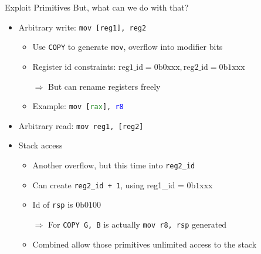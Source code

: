 \documentclass[usenames,dvipsnames]{beamer}
\begin{document}
    \begin{frame}{Exploit Primitives}
        But, what can we do with that?
        \begin{itemize}
            \item Arbitrary write: \lstinline{mov [reg1], reg2}
             {
            \begin{itemize}
                \item Use \lstinline{COPY} to generate \lstinline{mov}, overflow into modifier bits
                \item Register id constraints: $\text{reg1\_id} = 0\text{b}0\text{xxx}, \text{reg2\_id}=0\text{b}1\text{xxx}$
\item[$\Rightarrow$] But can rename registers freely
\item Example: \texttt{mov [\textcolor{ForestGreen}{rax}], \textcolor{blue}{r8}}
\end{itemize}

\begin{center}
\end{center}
}
\item Arbitrary read: \lstinline{mov reg1, [reg2]}
\item Stack access
 {
\begin{itemize}
\item Another overflow, but this time into \lstinline{reg2_id}
\item Can create \lstinline{reg2_id + 1}, using reg1\_id = $0\text{b}1$xxx
\item Id of \lstinline{rsp} is $0\text{b}0100$
\item[$\Rightarrow$] For \lstinline{COPY G, B} is actually \lstinline{mov r8, rsp} generated
\item Combined allow those primitives unlimited access to the stack
\end{itemize}
}
\end{itemize}
\end{frame}
\end{document}
